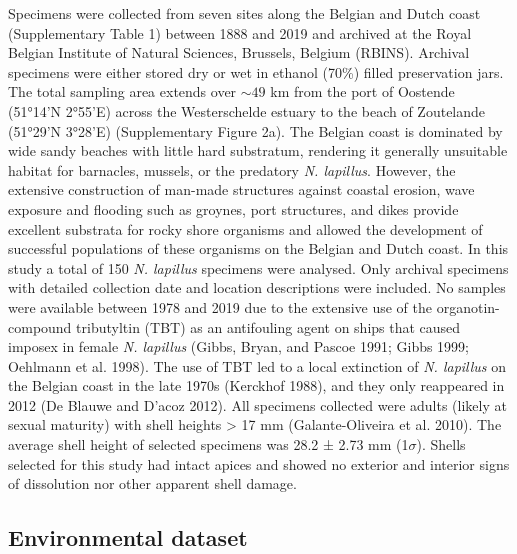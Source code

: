 \documentclass[smallextended]{svjour3}       %
\begin{document}
Specimens were collected from seven sites along the Belgian and Dutch
coast (Supplementary Table 1) between 1888 and 2019 and archived at the
Royal Belgian Institute of Natural Sciences, Brussels, Belgium (RBINS).
Archival specimens were either stored dry or wet in ethanol (70\%)
filled preservation jars. The total sampling area extends over
\(\sim49\) km from the port of Oostende (51°14'N 2°55'E) across the
Westerschelde estuary to the beach of Zoutelande (51°29'N 3°28'E)
(Supplementary Figure 2a). The Belgian coast is dominated by wide sandy
beaches with little hard substratum, rendering it generally unsuitable
habitat for barnacles, mussels, or the predatory \emph{N. lapillus}.
However, the extensive construction of man-made structures against
coastal erosion, wave exposure and flooding such as groynes, port
structures, and dikes provide excellent substrata for rocky shore
organisms and allowed the development of successful populations of these
organisms on the Belgian and Dutch coast. In this study a total of 150
\emph{N. lapillus} specimens were analysed. Only archival specimens with
detailed collection date and location descriptions were included. No
samples were available between 1978 and 2019 due to the extensive use of
the organotin-compound tributyltin (TBT) as an antifouling agent on
ships that caused imposex in female \emph{N. lapillus} (Gibbs, Bryan,
and Pascoe 1991; Gibbs 1999; Oehlmann et al. 1998). The use of TBT led
to a local extinction of \emph{N. lapillus} on the Belgian coast in the
late 1970s (Kerckhof 1988), and they only reappeared in 2012 (De Blauwe
and D'acoz 2012). All specimens collected were adults (likely at sexual
maturity) with shell heights \textgreater{} 17 mm (Galante-Oliveira et
al. 2010). The average shell height of selected specimens was 28.2 ±
2.73 mm (1\(\sigma\)). Shells selected for this study had intact apices
and showed no exterior and interior signs of dissolution nor other
apparent shell damage.

\hypertarget{environmental-dataset}{%
\subsection{Environmental dataset}\label{environmental-dataset}}
\end{document}
